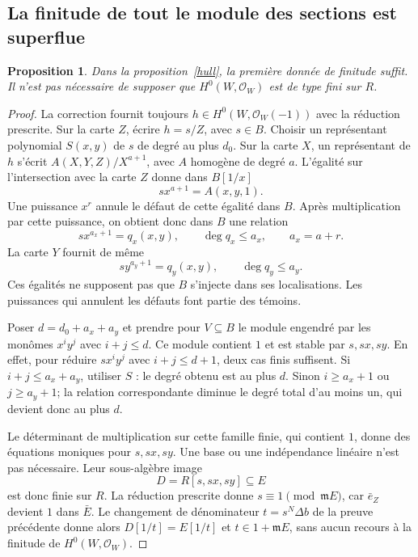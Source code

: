 \documentclass[11pt]{amsart}
\newtheorem{proposition}[lemma]{Proposition}
\newcommand{\OO}{\mathcal O}
\newcommand{\m}{\mathfrak m}
\begin{document}
\subsection{La finitude de tout le module des sections est superflue}

\begin{proposition}\label{hull-short}
Dans la proposition~\ref{hull}, la première donnée de finitude suffit.
Il n'est pas nécessaire de supposer que $H^0(W,\OO_W)$ est de type
fini sur $R$.
\end{proposition}
\begin{proof}
La correction fournit toujours
$h\in H^0(W,\OO_W(-1))$ avec la réduction prescrite. Sur la carte
$Z$, écrire $h=s/Z$, avec $s\in B$. Choisir un représentant
polynomial $S(x,y)$ de $s$ de degré au plus $d_0$.
Sur la carte $X$, un représentant de $h$ s'écrit
$A(X,Y,Z)/X^{a+1}$, avec $A$ homogène de degré $a$.
L'égalité sur l'intersection avec la carte $Z$ donne dans $B[1/x]$
\[
                  s x^{a+1}=A(x,y,1).
\]
Une puissance $x^r$ annule le défaut de cette égalité dans $B$.
Après multiplication par cette puissance, on obtient donc dans $B$
une relation
\[
               s x^{a_x+1}=q_x(x,y),\qquad \deg q_x\leq a_x,
               \qquad a_x=a+r.
\]
La carte $Y$ fournit de même
\[
               s y^{a_y+1}=q_y(x,y),\qquad \deg q_y\leq a_y.
\]
Ces égalités ne supposent pas que $B$ s'injecte dans ses localisations.
Les puissances qui annulent les défauts font partie des témoins.

Poser $d=d_0+a_x+a_y$ et prendre pour $V\subseteq B$ le module
engendré par les monômes $x^iy^j$ avec $i+j\leq d$.
Ce module contient $1$ et est stable par $s,sx,sy$.
En effet, pour réduire $s x^iy^j$ avec $i+j\leq d+1$, deux cas
finis suffisent. Si $i+j\leq a_x+a_y$, utiliser $S$ : le degré
obtenu est au plus $d$. Sinon $i\geq a_x+1$ ou $j\geq a_y+1$;
la relation correspondante diminue le degré total d'au moins un,
qui devient donc au plus $d$.

Le déterminant de multiplication sur cette famille finie, qui contient
$1$, donne des équations moniques pour $s,sx,sy$. Une base ou une
indépendance linéaire n'est pas nécessaire. Leur sous-algèbre image
\[
                         D=R[s,sx,sy]\subseteq E
\]
est donc finie sur $R$. La réduction prescrite donne
$s\equiv1\pmod{\m E}$, car $\bar e_Z$ devient $1$ dans $\bar E$.
Le changement de dénominateur $t=s^N\Delta b$ de la preuve précédente
donne alors $D[1/t]=E[1/t]$ et $t\in1+\m E$, sans aucun recours
à la finitude de $H^0(W,\OO_W)$.
\end{proof}
\end{document}
